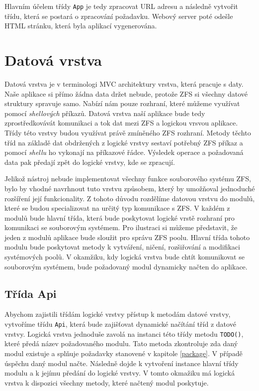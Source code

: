     Hlavním účelem třídy \verb|App| je tedy zpracovat URL adresu a následně vytvořit třídu, která se postará o zpracování požadavku. Webový server poté odešle HTML stránku, která byla aplikací vygenerována.

\section{Datová vrstva}
Datová vrstva je v terminologi MVC architektury vrstva, která pracuje s daty. Naše aplikace si přímo žádna data držet nebude, protože ZFS si všechny datové struktury spravuje samo. Nabízí nám pouze rozhraní, které můžeme využívat pomocí \emph{shellových} příkazů. Datová vrstva naší aplikace bude tedy zprostředkovávát komunikaci a tok dat mezi ZFS a logickou vrsvou aplikace. Třídy této vrstvy budou využívat právě zmíněného ZFS rozhraní. Metody těchto tříd na základě dat obdržených z logické vrstvy sestaví potřebný ZFS příkaz a pomocí \emph{shellu} ho vykonají na příkazové řádce. Výsledek operace a požadovaná data pak předají zpět do logické vrstvy, kde se zpracují.

Jelikož nástroj nebude implementovat všechny funkce souborového systému ZFS, bylo by vhodné navrhnout tuto vrstvu způsobem, který by umožňoval jednoduché rozšíření její funkcionality.
Z tohoto důvodu rozdělíme datovou vrstvu do modulů, které se budou specializovat na určitý typ komunikace s ZFS. V každém z modulů bude hlavní třída, která bude poskytovat logické vrstě rozhraní pro komunikaci se souborovým systémem. Pro ilustraci si můžeme představit, že jeden z modulů aplikace bude sloužit pro správu ZFS poolu. Hlavní třída tohoto modulu bude poskytovat metody k vytváření, ničení, rozšiřování a modifikaci systémových poolů. V okamžiku, kdy logická vrstva bude chtít komunikovat se souborovým systémem, bude požadovaný modul dynamicky načten do aplikace.
    \subsection{Třída Api}
    Abychom zajistili třídám logické vrstvy přístup k metodám datové vrstvy, vytvoříme třídu \verb|Api|, která bude zajišťovat dynamické načítání tříd z datové vrstvy. Logická vrstva jednoduše zavolá na instanci této třídy metodu \verb|TODO()|, které předá název požadovaného modulu. Tato metoda zkontroluje zda daný modul existuje a splňuje požadavky stanovené v kapitole \ref{package}. V případě úspěchu daný modul načte. Následně dojde k vytvoření instance hlavní třídy modulu a k jejímu předání do logické vrstvy. V tomto okmažiku má logická vrstva k dispozici všechny metody, které načtený modul poskytuje.

